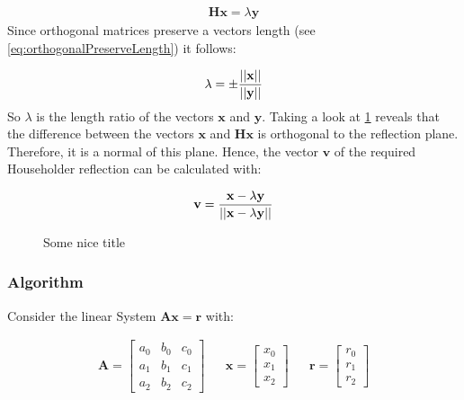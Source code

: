 \begin{align}
\label{eq:housholderCalculateReflection}
\mathbf{H} \mathbf{x} = \lambda \mathbf{y}
\end{align}
%
Since orthogonal matrices preserve a vectors length (see \cref{eq:orthogonalPreserveLength}) it follows:

\begin{align}
\label{eq:housholderCalculateReflectionLambda}
\lambda = \pm \frac{\left\vert\left\vert\mathbf{x}\right\vert\right\vert}{\left\vert\left\vert\mathbf{y}\right\vert\right\vert}
\end{align}
%
So $\lambda$ is the length ratio of the vectors $\mathbf{x}$ and $\mathbf{y}$.
Taking a look at \cref{fig:housholderCalculateReflection} reveals that the difference between the vectors $\mathbf{x}$ and $\mathbf{Hx}$ is orthogonal to the reflection plane.
Therefore, it is a normal of this plane.
Hence, the vector $\mathbf{v}$ of the required Householder reflection can be calculated with:

\begin{align}
\label{eq:housholderCalculateReflectionNormal}
\mathbf{v} = \frac{\mathbf{x} - \lambda \mathbf{y}}{\left\vert\left\vert\mathbf{x} - \lambda \mathbf{y}\right\vert\right\vert}
\end{align}


\begin{figure}
\centering
{}
\caption{Some nice title}
\label{fig:housholderCalculateReflection}
\end{figure}

\subsubsection{Algorithm}

Consider the linear System $\mathbf{Ax} = \mathbf{r}$ with:

\begin{align*}
\mathbf{A}
=
\begin{bmatrix}
a_0&b_0&c_0\\
a_1&b_1&c_1\\
a_2&b_2&c_2
\end{bmatrix}
&&
\mathbf{x}
=
\begin{bmatrix}
x_0\\
x_1\\
x_2
\end{bmatrix}
&&
\mathbf{r}
=
\begin{bmatrix}
r_0\\
r_1\\
r_2
\end{bmatrix}
\end{align*}



